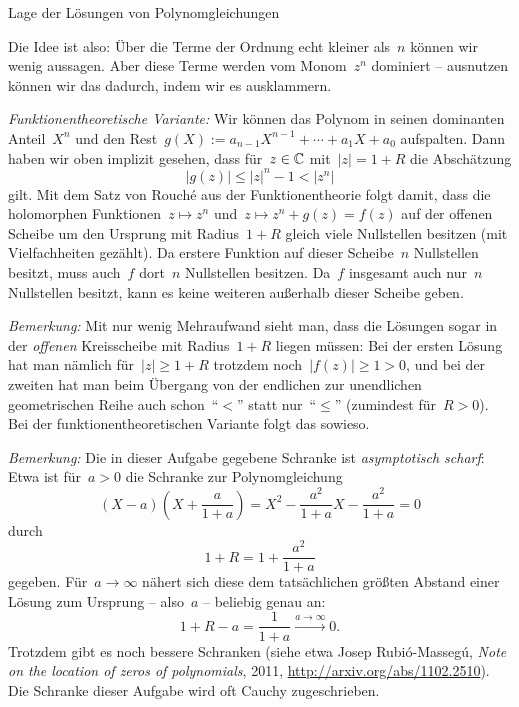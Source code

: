 \documentclass{algblatt}
\begin{document}
\begin{aufgabe}{Lage der Lösungen von Polynomgleichungen}
\begin{loesung}
Die Idee ist also: Über die Terme der Ordnung echt kleiner als~$n$ können wir
wenig aussagen. Aber diese Terme werden vom Monom~$z^n$ dominiert -- ausnutzen
können wir das dadurch, indem wir es ausklammern.

\emph{Funktionentheoretische Variante:} Wir können das Polynom in seinen
dominanten Anteil~$X^n$ und den Rest~$g(X) := a_{n-1}X^{n-1} + \cdots + a_1X +
a_0$ aufspalten. Dann haben wir oben implizit gesehen, dass für~$z \in \mathbb{C}$
mit~$|z| = 1 + R$ die Abschätzung
\[ |g(z)| \leq |z|^n - 1 < |z^n| \]
gilt. Mit dem Satz von Rouché aus der Funktionentheorie folgt damit, dass die
holomorphen Funktionen~$z \mapsto z^n$ und~$z \mapsto z^n + g(z) = f(z)$ auf
der offenen Scheibe um den Ursprung mit Radius~$1 + R$ gleich viele Nullstellen
besitzen (mit Vielfachheiten gezählt). Da erstere Funktion auf dieser
Scheibe~$n$ Nullstellen besitzt, muss auch~$f$ dort~$n$ Nullstellen besitzen. Da~$f$
insgesamt auch nur~$n$ Nullstellen besitzt, kann es keine weiteren außerhalb
dieser Scheibe geben.

\emph{Bemerkung:} Mit nur wenig Mehraufwand sieht man, dass die Lösungen sogar
in der \emph{offenen} Kreisscheibe mit Radius~$1 + R$ liegen müssen: Bei der
ersten Lösung hat man nämlich für~$|z| \geq 1 + R$ trotzdem noch~$|f(z)| \geq 1
> 0$, und bei der zweiten hat man beim Übergang von der endlichen zur
unendlichen geometrischen Reihe auch schon~"`$<$"' statt nur~"`$\leq$"'
(zumindest für~$R > 0$). Bei der funktionentheoretischen Variante folgt das
sowieso.

\emph{Bemerkung:} Die in dieser Aufgabe gegebene Schranke ist \emph{asymptotisch
scharf}: Etwa ist für~$a > 0$ die Schranke zur Polynomgleichung
\[ \left(X - a\right) \left(X + \frac{a}{1+a}\right) =
  X^2 - \frac{a^2}{1 + a} X - \frac{a^2}{1+a} = 0 \]
durch
\[ 1 + R = 1 + \frac{a^2}{1 + a} \]
gegeben. Für~$a \to \infty$ nähert sich diese dem tatsächlichen größten
Abstand einer Lösung zum Ursprung -- also~$a$ -- beliebig genau an:
\[ 1 + R - a = \frac{1}{1 + a} \xrightarrow{a \to \infty} 0. \]
Trotzdem gibt es noch bessere Schranken (siehe etwa Josep Rubió-Massegú,
\emph{Note on the location of zeros of polynomials}, 2011,
\url{http://arxiv.org/abs/1102.2510}). Die Schranke dieser Aufgabe wird
oft Cauchy zugeschrieben.
\end{loesung}
\end{aufgabe}
\end{document}

